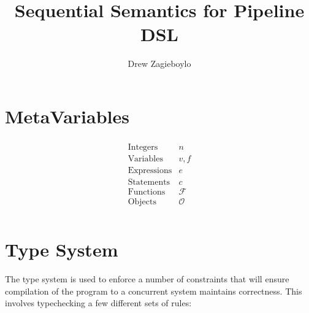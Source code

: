 \documentclass{article}
\begin{document}
\title{Sequential Semantics for Pipeline DSL}
\author{Drew Zagieboylo}
\maketitle

\section{MetaVariables}
\begin{align*}
  \begin{array}{lc}
    \mbox{Integers} & n \\
    \mbox{Variables} & v,f\\
    \mbox{Expressions} & e\\
    \mbox{Statements} & c\\
    \mbox{Functions} & \mathcal{F}\\
    \mbox{Objects} & \mathcal{O}\\
  \end{array}
\end{align*}

\section{Type System}

The type system is used to enforce a number of constraints
that will ensure compilation of the program to a concurrent
system maintains correctness. This involves typechecking
a few different sets of rules:
\end{document}
